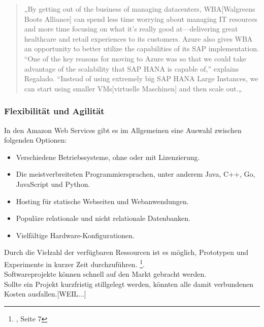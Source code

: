 \begin{quote}
      „By getting out of the business of managing datacenters, WBA[Walgreens Boots Alliance] can spend less time worrying about managing IT resources and more time focusing on what it’s really good at—delivering great healthcare and retail experiences to its customers. Azure also gives WBA an opportunity to better utilize the capabilities of its SAP implementation. “One of the key reasons for moving to Azure was so that we could take advantage of the scalability that SAP HANA is capable of,” explains Regalado. “Instead of using extremely big SAP HANA Large Instances, we can start using smaller VMs[virtuelle Maschinen] and then scale out.„

      {\cite{AZU01}}
\end{quote}

\subsubsection{Flexibilität und Agilität}
In den Amazon Web Services gibt es im Allgemeinen eine Auswahl zwischen folgenden Optionen:
\begin{itemize}
      \item
            Verschiedene Betriebssysteme, ohne oder mit Lizenzierung.
      \item
            Die meistverbreiteten Programmiersprachen, unter anderem Java, C++, Go, JavaScript und Python.{\cite{AMZ03}}

      \item
            Hosting für statische Webseiten und Webanwendungen.
                  {\cite{AMZ04}}

      \item
            Populäre relationale und nicht relationale Datenbanken.
                  {\cite{AMZ10}}
      \item
            Vielfältige Hardware-Konfigurationen.

\end{itemize}
\begin{flushleft}
      Durch die Vielzahl der verfügbaren Ressourcen ist es möglich, Prototypen und Experimente in kurzer Zeit durchzuführen.
      \footnote{{\cite{IDC01}}, Seite 7}.
      \\
      Softwareprojekte können schnell auf den Markt gebracht werden.
      \\
      Sollte ein Projekt kurzfristig stillgelegt werden, könnten alle damit verbundenen Kosten ausfallen.[WEIL...]
\end{flushleft}

